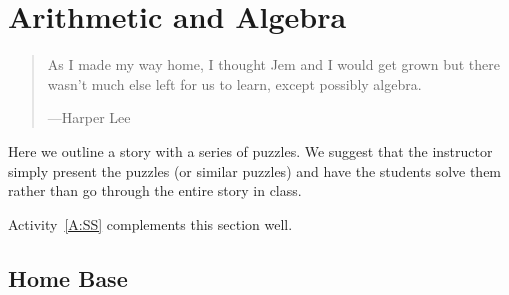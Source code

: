 \chapter{Arithmetic and Algebra}

\begin{quote}
As I made my way home, I thought Jem and I would get grown but there
wasn't much else left for us to learn, except possibly algebra.

\hfill---Harper Lee
\end{quote}


\begin{teachingnote}
Here we outline a story with a series of puzzles. We suggest that the
instructor simply present the puzzles (or similar puzzles) and have
the students solve them rather than go through the entire story in class.
\end{teachingnote}


\begin{activitynote}
Activity~\ref{A:SS} complements this section well.  %
\end{activitynote}


\section{Home Base}

